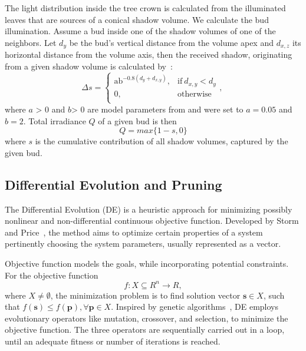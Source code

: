 The light distribution
inside the tree crown is calculated from the illuminated leaves that are
sources of a conical shadow volume. We calculate the bud illumination.
Assume a bud inside one of the shadow volumes of one of the
neighbors. Let \(d_{y}\) be the bud's vertical distance from the volume
apex and \(d_{x,z}\) its horizontal distance from the volume axis, then
the received shadow, originating from a given shadow volume is
calculated by~\cite{strnad_novel_2017}:
\begin{equation}
\Delta s = \left\{ \begin{matrix}
\text{ab}^{- 0.8\left( d_{y} + d_{x,y} \right)}, & \mathrm{\text{if}}\ d_{x,y} < d_{y} \\
0, & \mathrm{otherwise} \\
\end{matrix}, \right.\    
\end{equation}
where \(a\) \textgreater{} 0 and \(b\)\textgreater{} 0 are model
parameters from \cite{palubicki_self-organizing_2009} and were set to \(a = 0.05\) and \(b = 2\).
Total irradiance $Q$ of a given bud is then
\begin{equation}
  Q = max\{1 - s, 0\}\label{eqn:q}  
\end{equation}
where \(s\) is the cumulative contribution of all shadow volumes,
captured by the given bud.

\subsection{Differential Evolution and Pruning}
The Differential Evolution (DE) is a heuristic approach for minimizing possibly nonlinear and non-differential continuous objective function. Developed by Storm and Price~\cite{storn_differential_1997}, the method aims to optimize certain properties of a system pertinently choosing the system parameters, usually represented as a vector. 

Objective function models the goals, while incorporating potential constraints. For the objective function 
\begin{equation}
f:X \subseteq\!R^{n}\rightarrow \!R,
\end{equation}
where $X\neq\emptyset$, the minimization problem is to find solution vector $\mathbf{s}\in X$, such that $f(\mathbf{s})\leq f(\mathbf{p}), \forall \mathbf{p}\in X$. 
Inspired by genetic algorithms~\cite{davis1991handbook}, DE employs evolutionary operators like mutation, crossover, and selection, to minimize the objective function. The three operators are sequentially  carried out in a loop, until an adequate fitness or number of iterations is reached.

